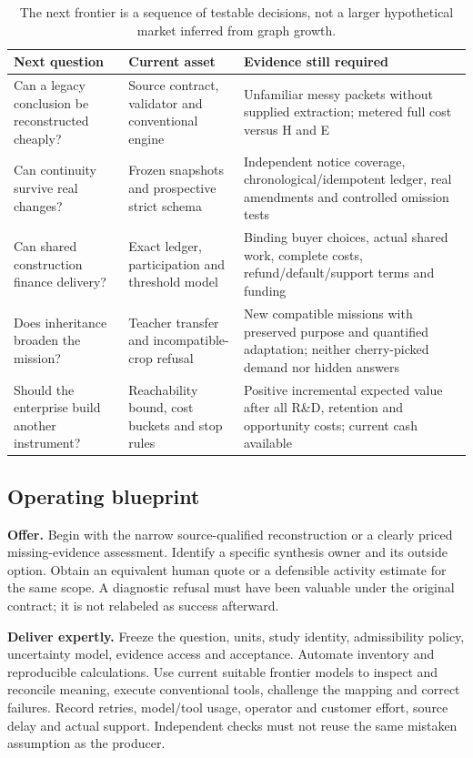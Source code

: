 \documentclass[11pt]{article}
\begin{document}
\begin{table}[htbp]
\small
\begin{tabularx}{\textwidth}{YYY}
\toprule
Next question & Current asset & Evidence still required\\
\midrule
Can a legacy conclusion be reconstructed cheaply? & Source contract, validator and conventional engine & Unfamiliar messy packets without supplied extraction; metered full cost versus H and E\\
Can continuity survive real changes? & Frozen snapshots and prospective strict schema & Independent notice coverage, chronological/idempotent ledger, real amendments and controlled omission tests\\
Can shared construction finance delivery? & Exact ledger, participation and threshold model & Binding buyer choices, actual shared work, complete costs, refund/default/support terms and funding\\
Does inheritance broaden the mission? & Teacher transfer and incompatible-crop refusal & New compatible missions with preserved purpose and quantified adaptation; neither cherry-picked demand nor hidden answers\\
Should the enterprise build another instrument? & Reachability bound, cost buckets and stop rules & Positive incremental expected value after all R\&D, retention and opportunity costs; current cash available\\
\bottomrule
\end{tabularx}
\caption{The next frontier is a sequence of testable decisions, not a larger hypothetical market inferred from graph growth.}
\end{table}

\subsection{Operating blueprint}

\textbf{Offer.} Begin with the narrow source-qualified reconstruction or a clearly priced missing-evidence assessment. Identify a specific synthesis owner and its outside option. Obtain an equivalent human quote or a defensible activity estimate for the same scope. A diagnostic refusal must have been valuable under the original contract; it is not relabeled as success afterward.

\textbf{Deliver expertly.} Freeze the question, units, study identity, admissibility policy, uncertainty model, evidence access and acceptance. Automate inventory and reproducible calculations. Use current suitable frontier models to inspect and reconcile meaning, execute conventional tools, challenge the mapping and correct failures. Record retries, model/tool usage, operator and customer effort, source delay and actual support. Independent checks must not reuse the same mistaken assumption as the producer.
\end{document}
